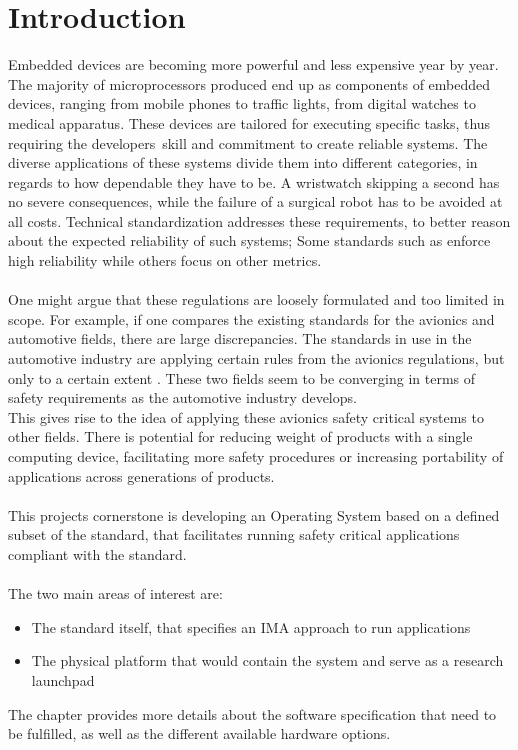 \chapter{Introduction}\label{ch:introduction}

Embedded devices are becoming more powerful and less expensive year by year.
The majority of microprocessors produced end up as components of embedded devices,
ranging from mobile phones to traffic lights, from digital watches to medical apparatus.
These devices are tailored for executing specific tasks,
thus requiring the developers\textquotesingle\ skill and commitment to create reliable systems.
The diverse applications of these systems divide them into different categories,
in regards to how dependable they have to be. A wristwatch skipping a second has no severe consequences,
while the failure of a surgical robot has to be avoided at all costs.
Technical standardization addresses these requirements,
to better reason about the expected reliability of such systems;
Some standards such as \arinc{} enforce high reliability while others focus on other metrics.
\\\\
One might argue that these regulations are loosely formulated and too limited in scope.
For example, if one compares the existing standards for the avionics and automotive fields,
there are large discrepancies.
The standards in use in the automotive industry are applying certain rules from the avionics regulations,
but only to a certain extent \cite {can_cars_fly}.
These two fields seem to be converging in terms of safety requirements as the automotive industry develops.
\\
This gives rise to the idea of applying these avionics safety critical systems to other fields.
There is potential for reducing weight of products with a single computing device, facilitating more safety procedures
or increasing portability of applications across generations of products.
\\\\
This project\textquotesingle s cornerstone is developing an Operating System based on a defined subset of the \arinc{} standard,
that facilitates running safety critical applications compliant with the \arinc{} standard.
\\\\
The two main areas of interest are:
\\
\begin{itemize}
\item The standard itself, that specifies an IMA approach to run applications
\item The physical platform that would contain the system and serve as a research launchpad
\end{itemize}
The  chapter provides more details about the software specification that need to be fulfilled,
as well as the different available hardware options.
